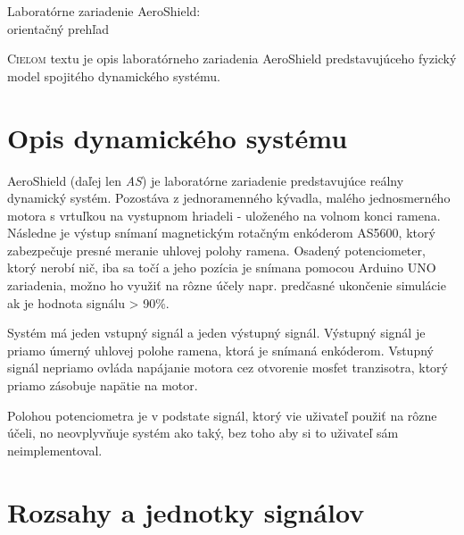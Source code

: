 \documentclass[a4paper, 10pt, ]{article}
\begin{document}
\begin{flushleft}
    Laboratórne zariadenie AeroShield:\\ orientačný prehľad
\end{flushleft}

\bigskip

\normalsize
\normalfont

\lstset{style=mystyle}










\noindent
\lettrine[lines=1, nindent=1pt, loversize=0.0]{C}{ieľom}
textu je opis laboratórneho zariadenia AeroShield predstavujúceho fyzický model spojitého dynamického systému.


\section{Opis dynamického systému}

AeroShield (daľej len \emph{AS}) je laboratórne zariadenie predstavujúce reálny dynamický systém. Pozostáva z jednoramenného kývadla, malého jednosmerného motora s vrtuľkou na vystupnom hriadeli - uloženého na volnom konci ramena. Následne je výstup snímaní magnetickým rotačným enkóderom AS5600, ktorý zabezpečuje presné meranie uhlovej polohy ramena. Osadený potenciometer, ktorý nerobí nič, iba sa točí a jeho pozícia je snímana pomocou Arduino UNO zariadenia, možno ho využiť na rôzne účely napr. predčasné ukončenie simulácie ak je hodnota signálu > 90\%.

Systém má jeden vstupný signál a jeden výstupný signál. Výstupný signál je priamo úmerný uhlovej polohe ramena, ktorá je snímaná enkóderom. Vstupný signál nepriamo ovláda napájanie motora cez otvorenie mosfet tranzisotra, ktorý priamo zásobuje napätie na motor.

Polohou potenciometra je v podstate signál, ktorý vie uživateľ použiť na rôzne účeli, no neovplyvňuje systém ako taký, bez toho aby si to uživateľ sám neimplementoval.



\section{Rozsahy a jednotky signálov}
\end{document}
